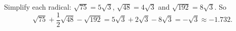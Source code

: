 Simplify each radical: $\sqrt{75}=5\sqrt3$, $\sqrt{48}=4\sqrt3$ and $\sqrt{192}=8\sqrt3$. So
\[
\sqrt{75}+\dfrac{1}{2}\sqrt{48}-\sqrt{192}=5\sqrt3+2\sqrt3-8\sqrt3=-\sqrt3\approx\boxed{-1.732}.
\]
